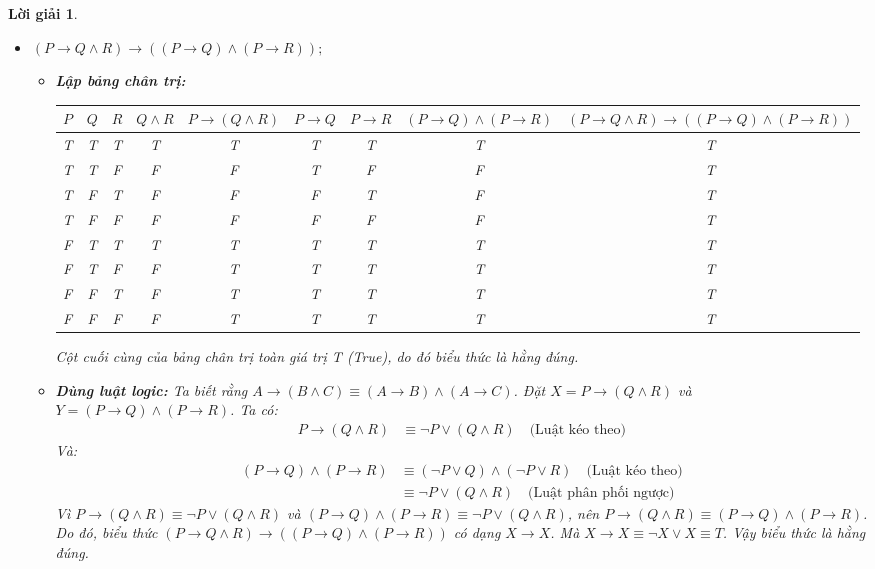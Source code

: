 \documentclass[11pt, oneside, a4paper]{article}
\newtheorem{loigiai}{Lời giải}[bt]
\begin{document}
\begin{loigiai}
\begin{itemize}
      \item[d)] $(P \rightarrow Q \land R) \rightarrow ((P \rightarrow Q) \land (P \rightarrow R));$
        \begin{itemize}
            \item \textbf{Lập bảng chân trị:}
            \begin{center}
            \tiny %
            \begin{tabular}{|c|c|c|c|c|c|c|c|c|}
            \hline
            $P$ & $Q$ & $R$ & $Q \land R$ & $P \rightarrow (Q \land R)$ & $P \rightarrow Q$ & $P \rightarrow R$ & $(P \rightarrow Q) \land (P \rightarrow R)$ & $(P \rightarrow Q \land R) \rightarrow ((P \rightarrow Q) \land (P \rightarrow R))$ \\
            \hline
            T & T & T & T & T & T & T & T & T \\
            T & T & F & F & F & T & F & F & T \\
            T & F & T & F & F & F & T & F & T \\
            T & F & F & F & F & F & F & F & T \\
            F & T & T & T & T & T & T & T & T \\
            F & T & F & F & T & T & T & T & T \\
            F & F & T & F & T & T & T & T & T \\
            F & F & F & F & T & T & T & T & T \\
            \hline
            \end{tabular}
            \end{center}
            Cột cuối cùng của bảng chân trị toàn giá trị T (True), do đó biểu thức là hằng đúng.
            \item \textbf{Dùng luật logic:}
            Ta biết rằng $A \rightarrow (B \land C) \equiv (A \rightarrow B) \land (A \rightarrow C)$.
            Đặt $X = P \rightarrow (Q \land R)$ và $Y = (P \rightarrow Q) \land (P \rightarrow R)$.
            Ta có:
            \begin{align*} P \rightarrow (Q \land R) &\equiv \lnot P \lor (Q \land R) \quad \text{(Luật kéo theo)} \end{align*}
            Và:
            \begin{align*} (P \rightarrow Q) \land (P \rightarrow R) &\equiv (\lnot P \lor Q) \land (\lnot P \lor R) \quad \text{(Luật kéo theo)} \\ &\equiv \lnot P \lor (Q \land R) \quad \text{(Luật phân phối ngược)} \end{align*}
            Vì $P \rightarrow (Q \land R) \equiv \lnot P \lor (Q \land R)$ và $(P \rightarrow Q) \land (P \rightarrow R) \equiv \lnot P \lor (Q \land R)$,
            nên $P \rightarrow (Q \land R) \equiv (P \rightarrow Q) \land (P \rightarrow R)$.
            Do đó, biểu thức $(P \rightarrow Q \land R) \rightarrow ((P \rightarrow Q) \land (P \rightarrow R))$ có dạng $X \rightarrow X$.
            Mà $X \rightarrow X \equiv \lnot X \lor X \equiv T$.
            Vậy biểu thức là hằng đúng.
        \end{itemize}
    

\end{itemize}
\end{loigiai}
\end{document}
